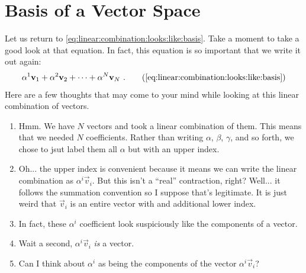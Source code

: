 \documentclass[12pt, oneside]{report}    %
\let\oldsection\section
\def\section{%
  \setcounter{sidenote}{1}%
  \oldsection
}
\begin{document}
\section{Basis of a Vector Space}\label{sec:basis}

Let us return to \eqref{eq:linear:combination:looks:like:basis}. Take a moment to take a good look at that equation. In fact, this equation is so important that we write it out again:
\begin{align}
    \alpha^1 \vec{v}_1 + \alpha^2\vec{v}_2 + \cdots + \alpha^N \vec{v}_N \ .
    \tag{\ref{eq:linear:combination:looks:like:basis}}
\end{align}
Here are a few thoughts that may come to your mind while looking at this linear combination of vectors.
\begin{enumerate}
    \item Hmm. We have $N$ vectors and took a linear combination of them. This means that we needed $N$ coefficients. Rather than writing $\alpha$, $\beta$, $\gamma$, and so forth, we chose to jsut label them all $\alpha$ but with an upper index. 
    \item Oh... the upper index is convenient because it means we can write the linear combination as $\alpha^i \vec{v}_i$. But this isn't a ``real'' contraction, right? Well... it follows the summation convention so I suppose that's legitimate. It is just weird that $\vec{v}_i$ is an entire vector with and additional lower index.
    \item In fact, these $\alpha^i$ coefficient look suspiciously like the components of a vector.
    \item Wait a second, $\alpha^i\vec{v}_i$ \emph{is} a vector.
    \item Can I think about $\alpha^i$ as being the components of the vector $\alpha^i\vec{v}_i$?
\end{enumerate}
\end{document}
